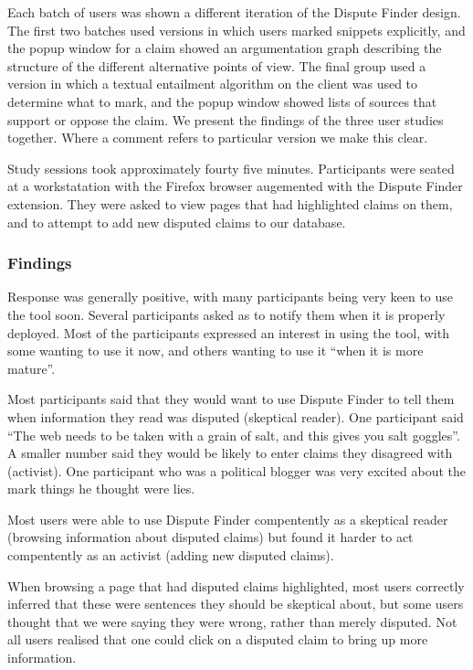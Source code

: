 \documentclass{www2010-submission}
\newcommand{\todo}[1]{}
\begin{document}
Each batch of users was shown a different iteration of the Dispute Finder design. The first two batches used versions in which users marked snippets explicitly, and the popup window for a claim showed an argumentation graph describing the structure of the different alternative points of view. The final group used a version in which a textual entailment algorithm on the client was used to determine what to mark, and the popup window showed lists of sources that support or oppose the claim. We present the findings of the three user studies together. Where a comment refers to particular version we make this clear.

Study sessions took approximately fourty five minutes. Participants were seated at a workstatation with the Firefox browser augemented with the Dispute Finder extension. They were asked to view pages that had highlighted claims on them, and to attempt to add new disputed claims to our database.

\todo{Need to finish the third wave of user studies}

\subsubsection{Findings}

Response was generally positive, with many participants being very keen to use the tool soon. Several participants asked as to notify them when it is properly deployed. Most of the participants expressed an interest in using the tool, with some wanting to use it now, and others wanting to use it ``when it is more mature''.

Most participants said that they would want to use Dispute Finder to tell them when information they read was disputed (skeptical reader). One participant said ``The web needs to be taken with a grain of salt, and this gives you salt goggles''. A smaller number said they would be likely to enter claims they disagreed with (activist). One participant who was a political blogger was very excited about the mark things he thought were lies.

Most users were able to use Dispute Finder compentently as a skeptical reader (browsing information about disputed claims) but found it harder to act compentently as an activist (adding new disputed claims).

When browsing a page that had disputed claims highlighted, most users correctly inferred that these were sentences they should be skeptical about, but some users thought that we were saying they were wrong, rather than merely disputed. Not all users realised that one could click on a disputed claim to bring up more information.
\end{document}
